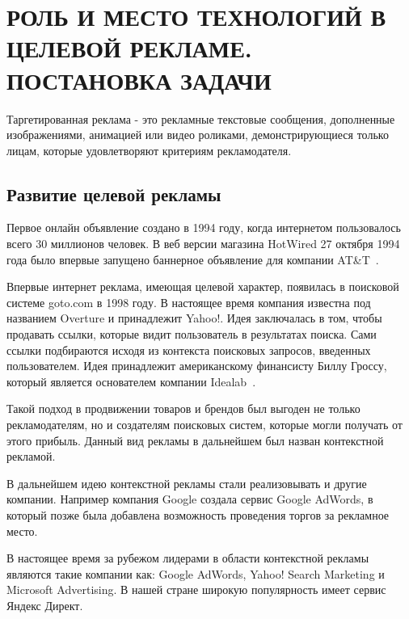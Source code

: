 \chapter{РОЛЬ И МЕСТО ТЕХНОЛОГИЙ В ЦЕЛЕВОЙ РЕКЛАМЕ. ПОСТАНОВКА ЗАДАЧИ}

Таргетированная реклама - это рекламные текстовые сообщения, дополненные изображениями, анимацией или видео роликами, демонстрирующиеся только лицам, которые удовлетворяют критериям рекламодателя.

\section{Развитие целевой рекламы}

Первое онлайн объявление создано в 1994 году, когда интернетом пользовалось всего 30 миллионов человек. В веб версии магазина HotWired 27 октября 1994 года было впервые запущено баннерное объявление для компании  AT\&T~\cite{kumar2016evolution}.

Впервые интернет реклама, имеющая целевой характер, появилась в поисковой системе goto.com в 1998 году. В настоящее время компания известна под названием Overture и принадлежит Yahoo!. Идея заключалась в том, чтобы продавать ссылки, которые видит пользователь в результатах поиска. Сами ссылки подбираются исходя из контекста поисковых запросов, введенных пользователем. Идея принадлежит американскому финансисту Биллу Гроссу, который является основателем компании Idealab~\cite{wang2016display}.

Такой подход в продвижении товаров и брендов был выгоден не только рекламодателям, но и создателям поисковых систем, которые могли получать от этого прибыль. Данный вид рекламы в дальнейшем был назван контекстной рекламой.

В дальнейшем идею контекстной рекламы стали реализовывать и другие компании. Например компания Google создала сервис Google AdWords, в который позже была добавлена возможность проведения торгов за рекламное место.

В настоящее время за рубежом лидерами в области контекстной рекламы являются такие компании как: Google AdWords, Yahoo! Search Marketing и Microsoft Advertising. В нашей стране широкую популярность имеет сервис Яндекс Директ.

